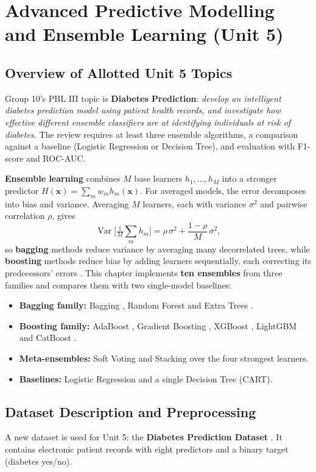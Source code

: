 \chapter{Advanced Predictive Modelling and Ensemble Learning (Unit 5)}

\section{Overview of Allotted Unit 5 Topics}
Group 10's PBL III topic is \textbf{Diabetes Prediction}: \emph{develop an intelligent diabetes prediction model using
patient health records, and investigate how effective different ensemble classifiers are at identifying individuals at
risk of diabetes.} The review requires at least three ensemble algorithms, a comparison against a baseline (Logistic
Regression or Decision Tree), and evaluation with F1-score and ROC-AUC.

\textbf{Ensemble learning} combines $M$ base learners $h_1,\dots,h_M$ into a stronger predictor
$H(\mathbf x)=\sum_m w_m h_m(\mathbf x)$. For averaged models, the error decomposes into bias and variance. Averaging
$M$ learners, each with variance $\sigma^2$ and pairwise correlation $\rho$, gives
\begin{equation}
\operatorname{Var}\!\Big[\tfrac{1}{M}\textstyle\sum_m h_m\Big]=\rho\,\sigma^2+\frac{1-\rho}{M}\,\sigma^2 ,
\label{eq:var}
\end{equation}
so \textbf{bagging} methods reduce variance by averaging many decorrelated trees, while \textbf{boosting} methods reduce
bias by adding learners sequentially, each correcting its predecessors' errors \cite{esl}. This chapter implements
\textbf{ten ensembles} from three families and compares them with two single-model baselines:
\begin{itemize}
\item \textbf{Bagging family:} Bagging \cite{breiman96}, Random Forest \cite{breiman01} and Extra Trees \cite{geurts}.
\item \textbf{Boosting family:} AdaBoost \cite{freund}, Gradient Boosting \cite{friedman}, XGBoost \cite{xgboost},
LightGBM \cite{lightgbm} and CatBoost \cite{catboost}.
\item \textbf{Meta-ensembles:} Soft Voting and Stacking \cite{wolpert} over the four strongest learners.
\item \textbf{Baselines:} Logistic Regression and a single Decision Tree (CART).
\end{itemize}

\section{Dataset Description and Preprocessing}
A new dataset is used for Unit 5: the \textbf{Diabetes Prediction Dataset} \cite{diabdata}. It contains
\dbRowsRaw{} electronic patient records with eight predictors and a binary target (diabetes yes/no).

